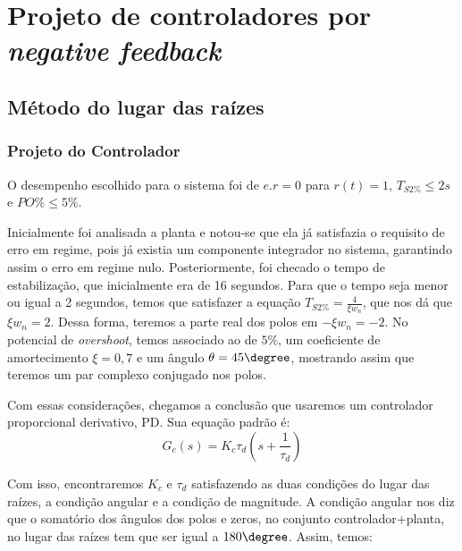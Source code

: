 \section{Projeto de controladores por \textit{negative feedback}}


\subsection{Método do lugar das raízes}

\subsubsection{Projeto do Controlador}

O desempenho escolhido para o sistema foi de $e.r=0$ para $r(t)=1$, $T_{S2\%}  \leq 2s$ e $PO \% \leq 5\%$.

Inicialmente foi analisada a planta e notou-se que ela já satisfazia o requisito de erro em regime, pois já existia um componente integrador no sistema, garantindo assim o erro em regime nulo. Posteriormente, foi checado o tempo de estabilização, que inicialmente era de 16 segundos. Para que o tempo seja menor ou igual a 2 segundos, temos que satisfazer a equação  $T_{S2 \%} = \frac{4}{\xi w_n}$, que nos dá que $\xi w_n = 2$. Dessa forma, teremos a parte real dos polos em $-\xi w_n = -2$. No potencial de \textit{overshoot}, temos associado ao de $5\%$, um coeficiente de amortecimento $\xi = 0,7$ e um ângulo $\theta = 45\degree$, mostrando assim que teremos um par complexo conjugado nos polos.

Com essas considerações, chegamos a conclusão que usaremos um controlador proporcional derivativo, PD. Sua equação padrão é:
\begin{equation}
    G_c(s) = K_c\tau_d\left(s+\frac{1}{\tau_d}\right)
\end{equation}

Com isso, encontraremos $K_c$ e $\tau_d$ satisfazendo as duas condições do lugar das raízes, a condição angular e a condição de magnitude. A condição angular nos diz que o somatório dos ângulos dos polos e zeros, no conjunto controlador+planta, no lugar das raízes tem que ser igual a $180\degree$. Assim, temos:

